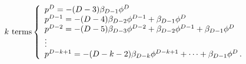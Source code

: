 \begin{equation}
\label{sigma} 
 k\hbox{ terms} \left\{\begin{array}{l} p^D=- (D-3)  \beta_{D-1}\phi^D\\
p^{D-1}=-(D-4) \beta_{D-2}\phi^{D-1} + \beta_{D-1} \phi^D\\ p^{D-2}=-(D-5)
\beta_{D-3}\phi^{D-2}+ \beta_{D-2} \phi^{D-1}+
\beta_{D-1}
\phi ^D\\ \vdots\\
p^{D-k+1}=-(D-k-2) \beta_{D-k}\phi^{D-k+1} +\dots + \beta_{D-1} \phi^D\, .
\end{array}\right. 
\end{equation} 
